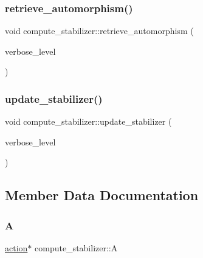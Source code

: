 \mbox{\label{classcompute__stabilizer_a363640c4b0009ef9ab5999a436647ac0}} 
\subsubsection{\texorpdfstring{retrieve\+\_\+automorphism()}{retrieve\_automorphism()}}
{\footnotesize\ttfamily void compute\+\_\+stabilizer\+::retrieve\+\_\+automorphism (\begin{DoxyParamCaption}\item[{\mbox{\hyperlink{galois_8h_a09fddde158a3a20bd2dcadb609de11dc}{I\+NT}}}]{verbose\+\_\+level }\end{DoxyParamCaption})}

\mbox{\label{classcompute__stabilizer_a9d7978a6326dc7f0935f557f0828ed8e}} 
\subsubsection{\texorpdfstring{update\+\_\+stabilizer()}{update\_stabilizer()}}
{\footnotesize\ttfamily void compute\+\_\+stabilizer\+::update\+\_\+stabilizer (\begin{DoxyParamCaption}\item[{\mbox{\hyperlink{galois_8h_a09fddde158a3a20bd2dcadb609de11dc}{I\+NT}}}]{verbose\+\_\+level }\end{DoxyParamCaption})}



\subsection{Member Data Documentation}
\mbox{\label{classcompute__stabilizer_ac09fca4d0aec68157de59fb25c5180f7}} 
\subsubsection{\texorpdfstring{A}{A}}
{\footnotesize\ttfamily \mbox{\hyperlink{classaction}{action}}$\ast$ compute\+\_\+stabilizer\+::A}

